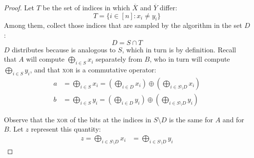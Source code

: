 \begin{proof}
    Let $T$ be the set of indices in which $\overline{X}$ and $\overline{Y}$ differ:
    \[
        T = \{ i \in [n]: x_i \neq y_i\} 
    \]
    Among them, collect those indices that are sampled by the algorithm in the set $D$:
    \[
        D = S \cap T 
    \]
    $D$ distributes \uar{} because is analogous to $S$, which in turn is \uar{} by definition. Recall that $A$ will compute $\bigoplus_{i \in S} x_i$ separately from $B$, who in turn will compute $\bigoplus_{i \in S} y_i$, and that \textsc{xor} is a commutative operator:
    \begin{align*}
        a &= \bigoplus_{i \in S} x_i = \left( \bigoplus_{i \in D} x_i \right) \oplus \left( \bigoplus_{i \in S \setminus D} x_i \right) \\
        b &= \bigoplus_{i \in S} y_i = \left( \bigoplus_{i \in D} y_i \right) \oplus \left( \bigoplus_{i \in S \setminus D} y_i \right)
    \end{align*}

    Observe that the \textsc{xor} of the bits at the indices in $S \setminus D$ is the same for $A$ and for $B$. Let $z$ represent this quantity:
    \begin{align*}        
        z = \bigoplus_{i \in S \setminus D} x_i &= \bigoplus_{i \in S \setminus D} y_i
    \end{align*}


\end{proof}
